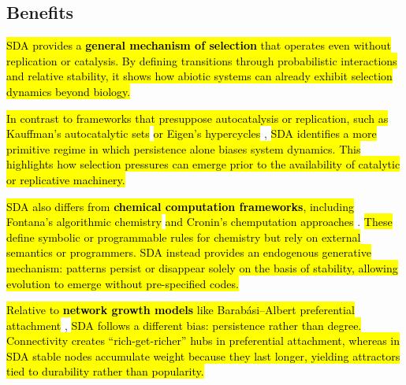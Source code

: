 \documentclass[preprint,12pt]{elsarticle}
\newcommand{\added}[1]{\hl{#1}}
\begin{document}
\subsection*{Benefits}

\added{
SDA provides a \textbf{general mechanism of selection} that operates even
without replication or catalysis. By defining transitions through probabilistic
interactions and relative stability, it shows how abiotic systems can already
exhibit selection dynamics beyond biology.
}

\added{
In contrast to frameworks that presuppose autocatalysis or replication, such as Kauffman’s autocatalytic sets} \cite{kauffman1986autocatalytic,hordijk2012autocatalytic,nghe2015prebiotic}
\added{or Eigen’s hypercycles} \cite{eigen},
\added{SDA identifies a more primitive regime in which persistence alone biases
system dynamics. This highlights how selection pressures can emerge prior to
the availability of catalytic or replicative machinery.}


\added{
SDA also differs from \textbf{chemical computation frameworks}, including
Fontana’s algorithmic chemistry} \cite{fontana1991algorithmic} \added{and Cronin’s
chemputation approaches} \cite{cronin2024chemputation}. \added{These define
symbolic or programmable rules for chemistry but rely on external semantics or
programmers. SDA instead provides an endogenous generative mechanism: patterns
persist or disappear solely on the basis of stability, allowing evolution to
emerge without pre-specified codes.}

\added{
Relative to \textbf{network growth models} like Barabási–Albert preferential
attachment} \cite{barabasi1999emergence,strogatz2001exploring}, \added{SDA
follows a different bias: persistence rather than degree. Connectivity creates
“rich-get-richer” hubs in preferential attachment, whereas in SDA stable nodes
accumulate weight because they last longer, yielding attractors tied to
durability rather than popularity.}
\end{document}
